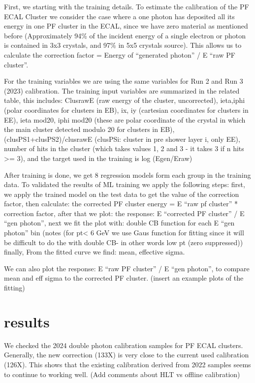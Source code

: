 First, we starting with the training details. To estimate the calibration of the PF ECAL Cluster we consider the case where a one photon has deposited all its energy in one PF cluster in the ECAL, since we have zero material as mentioned before (Approximately 94\% of the incident energy of a single electron or photon is contained in 3x3 crystals, and 97\% in 5x5 crystals source).  
This allows us to calculate the correction factor = Energy of “generated photon” / E “raw PF cluster”.

For the training variables we are using the same variables for Run 2 and Run 3 (2023) calibration. The training input variables are summarized in the related table, this includes:  
ClusrawE (raw energy of the cluster, uncorrected), 
ieta,iphi (polar coordinates for clusters in EB), 
ix, iy (cartesian coordinates for clusters in EE), 
ieta mod20, iphi mod20 (these are polar coordinate of the crystal in which the main cluster detected modulo 20 for clusters in EB), 
(clusPS1+clusPS2)/clusrawE (clusPSi: cluster in pre shower layer i, only EE), 
 number of hits in the cluster (which takes values 1, 2 and 3 - it takes 3 if n hits >= 3), 
and the target used in the training is log (Egen/Eraw)  

After training is done, we get 8 regression models form each group in the training data. To validated the results of ML training we apply the following steps: 
first, we apply the trained model on the test data to get the value of the correction factor, 
then calculate:  the corrected PF cluster energy = E “raw pf cluster” * correction factor, 
after that we plot: the response: E “corrected PF cluster” / E “gen photon”, 
next we fit the plot with: double CB function for each E “gen photon” bin (notes (for pt< 6 GeV we use Gaus function for fitting since it will be difficult to do the with double CB- in other words low pt (zero suppressed)) 
finally, From the fitted curve we find: mean, effective sigma.  

We can also plot the response: E “raw PF cluster” / E “gen photon”, to compare mean and eff sigma to the corrected PF cluster. (insert an example plots of the fitting)   
\section{results}
We checked the 2024 double photon calibration samples for PF ECAL clusters. Generally, the new correction (133X) is very close to the current used calibration (126X). This shows that the existing calibration derived from 2022 samples seems to continue to working well. (Add comments about HLT vs offline calibration)

